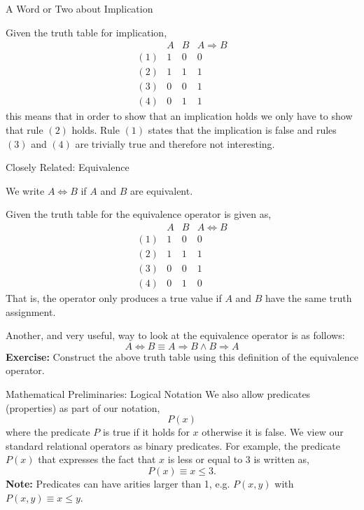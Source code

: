 \documentclass{beamer}
\begin{document}
\begin{frame}{A Word or Two about Implication}

Given the truth table for implication,
\[
\begin{array}{lcc|c}
&A & B & A \Rightarrow B\\ \hline
(1)& 1 & 0 & 0\\
(2) & 1 & 1 & 1\\
(3) & 0 & 0 & 1\\
(4) & 0 & 1 & 1
\end{array}
\]
this means that in order to show that an implication holds we only have to show that rule $(2)$
holds.  Rule $(1)$ states that the implication is false and rules $(3)$ and $(4)$ are trivially true and
therefore not interesting.
\end{frame}

\begin{frame}{Closely Related: Equivalence}

We write $A \Leftrightarrow B$ if $A$ and $B$ are equivalent.

Given the truth table for the equivalence operator is given as,
\[
\begin{array}{lcc|c}
&A & B & A \Leftrightarrow B\\ \hline
(1)& 1 & 0 & 0\\
(2) & 1 & 1 & 1\\
(3) & 0 & 0 & 1\\
(4) & 0 & 1 & 0
\end{array}
\]
That is, the operator only produces a true value if $A$ and $B$ have the same truth assignment.

Another, and very useful, way to look at the equivalence operator is as follows:
\[
A \Leftrightarrow B \equiv A \Rightarrow B \wedge B \Rightarrow A
\] 
{\bf Exercise:} Construct  the above truth table using this definition of the equivalence operator.
\end{frame}

\begin{frame}{\large Mathematical  Preliminaries: Logical Notation}
We also allow predicates (properties) as part of our notation,
\[
P(x)
\]
where the predicate $P$ is true if it holds for $x$ otherwise it is false.  We view our
standard relational operators as binary predicates.  For example, the predicate
$P(x)$ that expresses the fact that $x$ is less or equal to 3 is written as,
\[
P(x) \equiv x \le 3.
\]
{\bf Note:} Predicates can have arities larger than 1, e.g. $P(x,y)$ with $P(x,y)\equiv x \le y$.
\end{frame}
\end{document}
